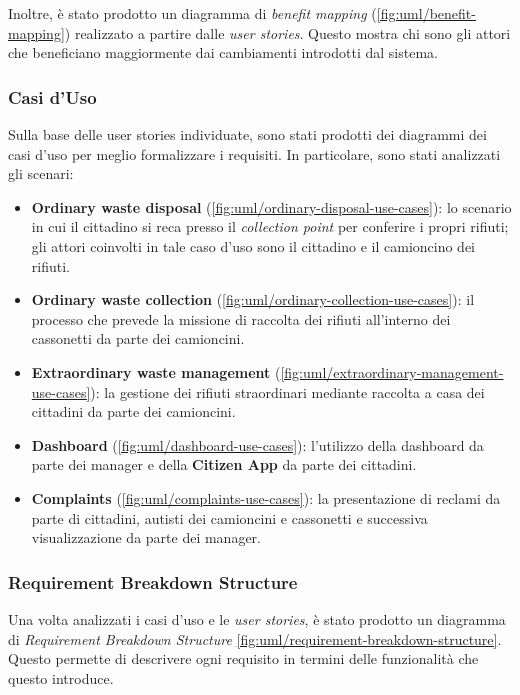 Inoltre, è stato prodotto un diagramma di \textit{benefit mapping} (\ref{fig:uml/benefit-mapping}) realizzato a partire dalle \textit{user stories}. Questo mostra chi sono gli attori che beneficiano maggiormente dai cambiamenti introdotti dal sistema.

\subsubsection{Casi d'Uso}
Sulla base delle user stories individuate, sono stati prodotti dei diagrammi dei casi d'uso per meglio formalizzare i requisiti. In particolare, sono stati analizzati gli scenari:
\begin{itemize}
    \item \textbf{Ordinary waste disposal} (\ref{fig:uml/ordinary-disposal-use-cases}): lo scenario in cui il cittadino si reca presso il \textit{collection point} per conferire i propri rifiuti; gli attori coinvolti in tale caso d'uso sono il cittadino e il camioncino dei rifiuti.
    \item \textbf{Ordinary waste collection} (\ref{fig:uml/ordinary-collection-use-cases}): il processo che prevede la missione di raccolta dei rifiuti all'interno dei cassonetti da parte dei camioncini.
    \item \textbf{Extraordinary waste management} (\ref{fig:uml/extraordinary-management-use-cases}): la gestione dei rifiuti straordinari mediante raccolta a casa dei cittadini da parte dei camioncini.
    \item \textbf{Dashboard} (\ref{fig:uml/dashboard-use-cases}): l'utilizzo della dashboard da parte dei manager e della \textbf{Citizen App} da parte dei cittadini.
    \item \textbf{Complaints} (\ref{fig:uml/complaints-use-cases}): la presentazione di reclami da parte di cittadini, autisti dei camioncini e cassonetti e successiva visualizzazione da parte dei manager.
\end{itemize}

\subsubsection{Requirement Breakdown Structure}
Una volta analizzati i casi d'uso e le \textit{user stories}, è stato prodotto un diagramma di \textit{Requirement Breakdown Structure} \ref{fig:uml/requirement-breakdown-structure}. Questo permette di descrivere ogni requisito in termini delle funzionalità che questo introduce.

